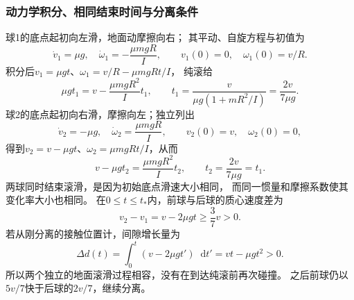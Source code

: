 \documentclass[UTF8,fontset=fandol,a4paper,11pt]{ctexart}
\newcommand{\dd}{\mathop{}\!\mathrm{d}}
\begin{document}
\subsubsection*{动力学积分、相同结束时间与分离条件}
球1的底点起初向左滑，地面动摩擦向右；
其平动、自旋方程与初值为
\[
\dot v_1=\mu g,\quad \dot\omega_1=-\frac{\mu mgR}{I},
\qquad v_1(0)=0,\quad\omega_1(0)=v/R.
\]
积分后$v_1=\mu gt$、$\omega_1=v/R-\mu mgRt/I$，
纯滚给
\[
\mu gt_1=v-\frac{\mu mgR^2}{I}t_1,
\qquad t_1=\frac{v}{\mu g(1+mR^2/I)}=\frac{2v}{7\mu g}.
\]
球2的底点起初向右滑，摩擦向左；独立列出
\[
\dot v_2=-\mu g,\quad \dot\omega_2=\frac{\mu mgR}{I},
\qquad v_2(0)=v,\quad\omega_2(0)=0,
\]
得到$v_2=v-\mu gt$、$\omega_2=\mu mgRt/I$，从而
\[
v-\mu gt_2=\frac{\mu mgR^2}{I}t_2,
\qquad t_2=\frac{2v}{7\mu g}=t_1.
\]
两球同时结束滚滑，是因为初始底点滑速大小相同，
而同一惯量和摩擦系数使其变化率大小也相同。
在$0\leq t\leq t_*$内，前球与后球的质心速度差为
\[
v_2-v_1=v-2\mu gt\geq\frac37v>0.
\]
若从刚分离的接触位置计，间隙增长量为
\[
\Delta d(t)=\int_0^t(v-2\mu gt')\dd t'=vt-\mu gt^2>0.
\]
所以两个独立的地面滚滑过程相容，没有在到达纯滚前再次碰撞。
之后前球仍以$5v/7$快于后球的$2v/7$，继续分离。
\end{document}
